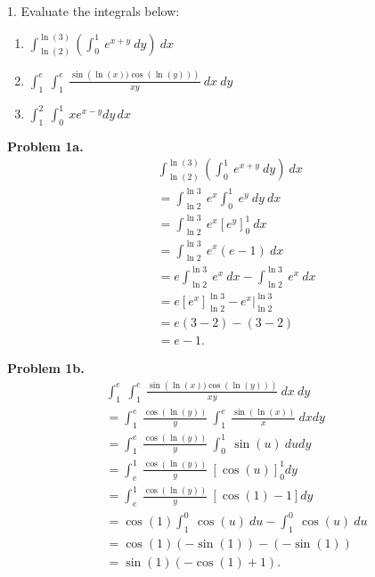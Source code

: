 \documentclass{report}
\begin{document}
    \begin{mdframed}
        1. Evaluate the integrals below:
        \begin{enumerate}[label=(\alph*)]
            \item \relax $\int_{\ln{(2)}}^{\ln{(3)}}\left(\int_{0}^{1}\ e^{x+y}\ dy\right)\ dx$
            \item  $\int_{1}^{e}\ \int_{1}^{e}\ \frac{\sin{\left(\ln{(x)})\cos{\left(\ln{(y)}\right)}\right)}}{xy}\ dx\ dy$
            \item  $\int_{1}^{2}\ \int_{0}^{1}\ xe^{x-y} dy\, dx$
        \end{enumerate}
    \end{mdframed}
    \bigbreak \noindent 
    \textbf{Problem 1a.}
    \begin{align*}
        &\int_{\ln{(2)}}^{\ln{(3)}}\left(\int_{0}^{1}\ e^{x+y}\ dy\right)\ dx \\
        &=\int_{\ln{2}}^{\ln{3}}\ e^{x}\int_{0}^{1}\ e^{y}\ dy\ dx \\
        &=\int_{\ln{2}}^{\ln{3}}\ e^{x}[e^{y}]_0^{1}\ dx \\
        &=\int_{\ln{2}}^{\ln{3}}\ e^{x}(e-1)\ dx \\
        &=e\int_{\ln{2}}^{\ln{3}}\ e^{x}\ dx - \int_{\ln{2}}^{\ln{3}}\ e^{x}\ dx \\
        &=e[e^{x}]_{\ln{2}}^{\ln{3}} - e^{x}\bigg|_{\ln{2}}^{\ln{3}} \\
        &=e(3-2) - (3-2) \\
        &=e-1
    .\end{align*}

    \bigbreak \noindent 
    \textbf{Problem 1b.}
    \begin{align*}
         &\int_{1}^{e}\ \int_{1}^{e}\ \frac{\sin{\left(\ln{(x)})\cos{\left(\ln{(y)}\right)}\right)}}{xy}\ dx\ dy \\
         &=\int_{1}^{e}\ \frac{\cos{\left(\ln{(y)}\right)}}{y}\ \int_{1}^{e}\ \frac{\sin{\left(\ln{(x)}\right)}}{x}\ dxdy \\
         &=\int_{1}^{e}\ \frac{\cos{\left(\ln{(y)}\right)}}{y}\ \int_{0}^{1}\ \sin{\left(u\right)}\ du dy \\
         &=\int_{e}^{1}\ \frac{\cos{\left(\ln{(y)}\right)}}{y}\ [\cos{\left(u\right)}]_{0}^{1}dy \\
         &=\int_{e}^{1}\ \frac{\cos{\left(\ln{(y)}\right)}}{y}\ [\cos{\left(1\right)} -1]dy \\
         &=\cos{\left(1\right)}\int_{1}^{0}\ \cos{\left(u\right)}\ du - \int_{1}^{0}\ \cos{\left(u\right)}\ du \\
         &=\cos{\left(1\right)}(-\sin{\left(1\right)}) - (-\sin{\left(1\right)}) \\
         &=\sin{\left(1\right)}(-\cos{\left(1\right)} + 1)
    .\end{align*}
\end{document}
